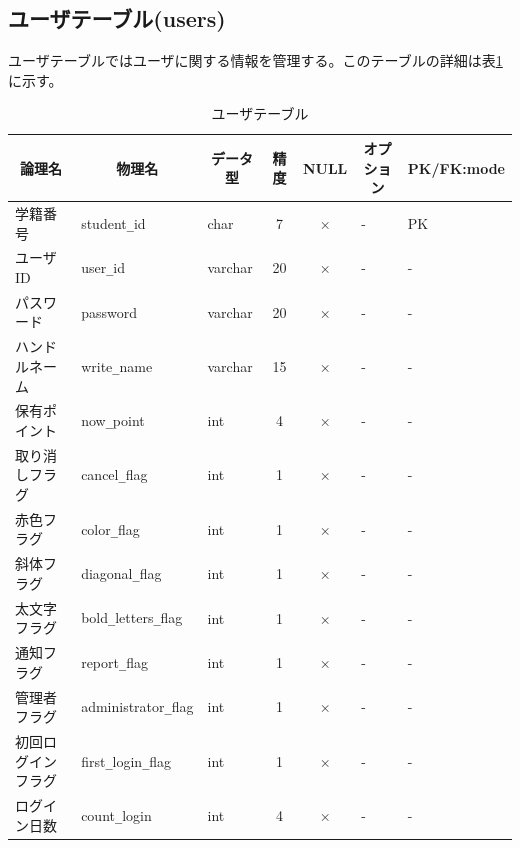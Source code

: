 \documentclass[a4j]{jarticle}
\begin{document}
\subsection{ユーザテーブル(users)}
ユーザテーブルではユーザに関する情報を管理する。このテーブルの詳細は表\ref{tab:user} に示す。
\begin{table}[h]

  \caption{ユーザテーブル}
  \begin{center}
    \footnotesize
    \begin{tabular}{|l|l|l|c|c|l|l|} \hline

      \multicolumn{1}{|c|}{論理名}&\multicolumn{1}{|c|}{物理名}&\multicolumn{1}{|c|}{データ型}&精度&NULL&\multicolumn{1}{|c|}{オプション}&\multicolumn{1}{|c|}{PK/FK:mode}\\\hline \hline
      学籍番号&student\verb|_|id&char&7&×&-&\multicolumn{1}{|l|}{PK} \\\hline
      ユーザID&user\verb|_|id&varchar&20&×&-&- \\ \hline
      パスワード&password&varchar&20&×&-&- \\ \hline
      ハンドルネーム&write\verb|_|name&varchar&15&×&-&- \\ \hline
      保有ポイント&now\verb|_|point&int&4&×&-&- \\ \hline
      取り消しフラグ&cancel\verb|_|flag&int&1&×&-&- \\ \hline
      赤色フラグ&color\verb|_|flag&int&1&×&-&- \\ \hline
      斜体フラグ&diagonal\verb|_|flag&int&1&×&-&- \\ \hline
      太文字フラグ&bold\verb|_|letters\verb|_|flag&int&1&×&-&- \\ \hline
      通知フラグ&report\verb|_|flag&int&1&×&-&- \\ \hline
      管理者フラグ&administrator\verb|_|flag&int&1&×&-&- \\ \hline
      初回ログインフラグ&first\verb|_|login\verb|_|flag&int&1&×&-&- \\ \hline
      ログイン日数&count\verb|_|login&int&4&×&-&-\\ \hline
    \end{tabular}
    \label{tab:user}
  \end{center}
\end{table}
\end{document}
